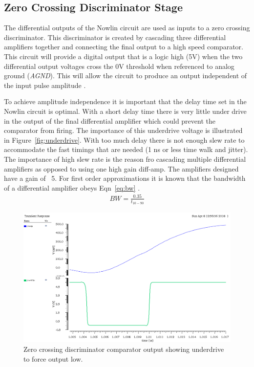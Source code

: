 \documentclass[12pt,oneside,final]{siuethesis}
\theoremstyle{definition}
\begin{document}
\subsection{Zero Crossing Discriminator Stage}
\par The differential outputs of the Nowlin circuit are used as inputs to a zero crossing discriminator. This discriminator is created by cascading three differential amplifiers together and connecting the final output to a high speed comparator. This circuit will provide a digital output that is a logic high (5V) when the two differential output voltages cross the 0V threshold when referenced to analog ground (\emph{AGND}). This will allow the circuit to produce an output independent of the input pulse amplitude \cite{CFD}. 
\par To achieve amplitude independence it is important that the delay time set in the Nowlin circuit is optimal. With a short delay time there is very little under drive in the output of the final differential amplifier which could prevent the comparator from firing. The importance of this underdrive voltage is illustrated in Figure~\ref{fig:underdrive}. With too much delay there is not enough slew rate to accommodate the fast timings that are needed (1 ns or less time walk and jitter). The importance of high slew rate is the reason fro cascading multiple differential amplifiers as opposed to using one high gain diff-amp. The amplifiers designed have a gain of ~5. For first order approximations it is known that the bandwidth of a differential amplifier obeys Eqn~\ref{eq:bw} \cite{CFD}.
\begin{eqnarray}
BW = \frac{0.35}{t_{10-90}}
\label{eq:bw}
\end{eqnarray}
\begin{figure}[ht]
\centering
\includegraphics[scale=.4,keepaspectratio=true]{images/zcd_out.png} 
\caption{Zero crossing discriminator comparator output showing underdrive to force output low.}
\label{fig:ZCD}
\end{figure}
\end{document}
